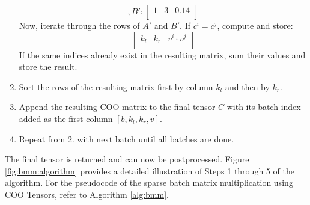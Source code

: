 \begin{enumerate}[label*=\arabic*.]
\begin{equation*}
              , B':
              \begin{bmatrix}
                  1 & 3 & 0.14 \\
              \end{bmatrix}
          \end{equation*}
          Now, iterate through the rows of $A'$ and $B'$. If $c^i = c^j$, compute and store:
          \begin{equation*}
              \begin{bmatrix}
                  k_l & k_r & v^i \cdot v^j \\
              \end{bmatrix}
          \end{equation*}
          If the same indices already exist in the resulting matrix, sum their values and store the result.
    \item Sort the rows of the resulting matrix first by column $k_l$ and then by $k_r$.
    \item Append the resulting COO matrix to the final tensor $C$ with its batch index added as the
          first column $[b, k_l, k_r, v]$.
    \item Repeat from 2. with next batch until all batches are done.
\end{enumerate}
The final tensor is returned and can now be postprocessed. Figure \ref{fig:bmm:algorithm} provides
a detailed illustration of Steps 1 through 5 of the algorithm. For the pseudocode of the sparse batch
matrix multiplication using COO Tensors, refer to Algorithm \ref{alg:bmm}.

